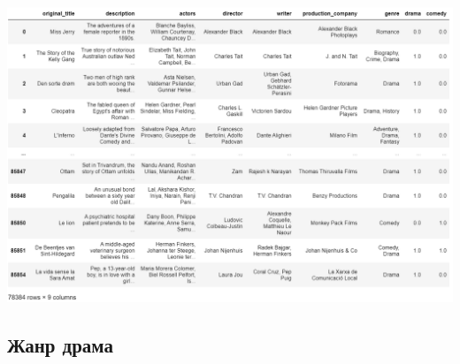 \documentclass[a4paper,titlepage]{article}
\begin{document}
{   \includegraphics[scale = 1]{1_1}
       

    \hypertarget{ux436ux430ux43dux440-ux434ux440ux430ux43cux430}{%
\subsection{Жанр
драма}\label{ux436ux430ux43dux440-ux434ux440ux430ux43cux430}}


}
\end{document}
